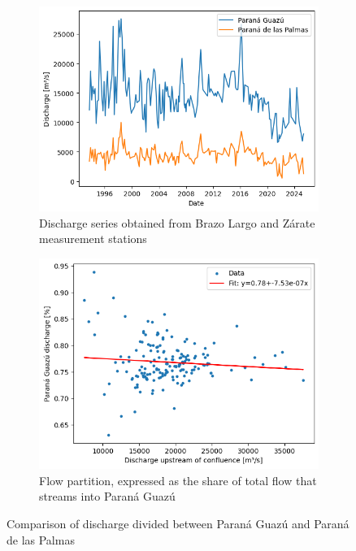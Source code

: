 \begin{figure}[h!]
    \centering
    \begin{subfigure}[b]{0.48\linewidth}
        \centering
        \includegraphics[width=\linewidth]{figures/ch5/discharge series.png}
        \caption{Discharge series obtained from Brazo Largo and Zárate measurement stations}
        \label{fig:discharge_series}
    \end{subfigure}
    \hfill
    \begin{subfigure}[b]{0.48\linewidth}
        \centering
        \includegraphics[width=\linewidth]{figures/ch5/flow partition.png}
        \caption{Flow partition, expressed as the share of total flow that streams into Paraná Guazú}
        \label{fig:flow_partition}
    \end{subfigure}
    
    \caption{Comparison of discharge divided between Paraná Guazú and Paraná de las Palmas}
\end{figure}

